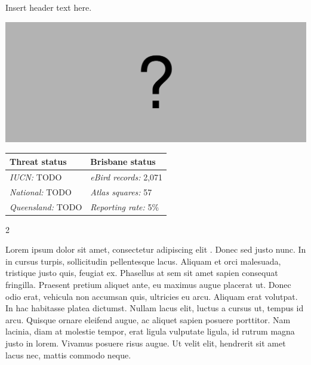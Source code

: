 \documentclass[12pt,openany,oneside]{book}
\let\origfigure\figure
\let\endorigfigure\endfigure
\renewenvironment{figure}[1][2] {
  \expandafter\origfigure\expandafter[H]
} {
  \endorigfigure
}
\let\Begin\begin
\let\End\end
\theoremstyle{definition}
\theoremstyle{definition}
\theoremstyle{definition}
\theoremstyle{remark}
\begin{document}

Insert header text here.

\begin{figure}
\centering
\includegraphics[width=\textwidth,keepaspectratio=true]{assets/misc/missing-profile.png}
\caption{Insert caption here.}
\end{figure}

\begin{tabu} to 
\toprule
Threat status & Brisbane status\\
\midrule
\textit{IUCN:} TODO & \textit{eBird records:} 2,071\\
\textit{National:} TODO & \textit{Atlas squares:} 57\\
\textit{Queensland:} TODO & \textit{Reporting rate:} 5\%\\
\bottomrule
\end{tabu} 
\vspace{0.15cm}

\Begin{multicols}{2}

Lorem ipsum dolor sit amet, consectetur adipiscing elit
\citep{rexample1, rexample2, rexample3}. Donec sed justo nunc. In in
cursus turpis, sollicitudin pellentesque lacus. Aliquam et orci
malesuada, tristique justo quis, feugiat ex. Phasellus at sem sit amet
sapien consequat fringilla. Praesent pretium aliquet ante, eu maximus
augue placerat ut. Donec odio erat, vehicula non accumsan quis,
ultricies eu arcu. Aliquam erat volutpat. In hac habitasse platea
dictumst. Nullam lacus elit, luctus a cursus ut, tempus id arcu. Quisque
ornare eleifend augue, ac aliquet sapien posuere porttitor. Nam lacinia,
diam at molestie tempor, erat ligula vulputate ligula, id rutrum magna
justo in lorem. Vivamus posuere risus augue. Ut velit elit, hendrerit
sit amet lacus nec, mattis commodo neque.

\End{multicols}

\clearpage
\end{document}
